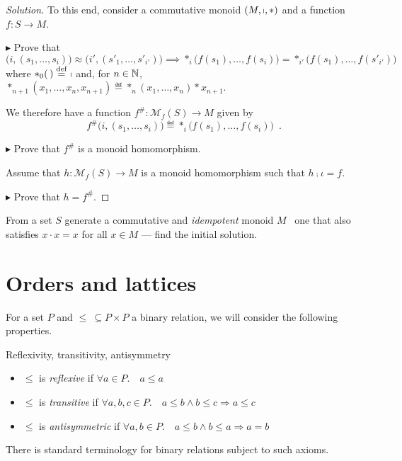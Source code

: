 \begin{proof}[Solution]
To this end, consider a commutative monoid $(M,\shortmid,\ast)$ and a function
$f:S\to M$.

$\blacktriangleright$ Prove that
\[
  \big(i,(s_1,\ldots,s_i)\big)
  \approx
  \big(i',(s'_1,\ldots,s'_{i'})\big)
  \implies
  \ast_i\big(f(s_1),\ldots,f(s_i)\big)
  =
  \ast_{i'}\big(f(s_1),\ldots,f(s'_{i'})\big)
\]
where $\ast_0(\,) \stackrel{\text{def}}{=}\ \shortmid$ and, for $n\in\mathbb{N}$,
$\ast_{n+1}(x_1,\ldots,x_n,x_{n+1})\eqdef \ast_n(x_1,\ldots,x_n)\ast x_{n+1}$.

We therefore have a function $f^\#: \mathcal M_f(S)\to M$ given by
\[
  f^\#\big(i,(s_1,\ldots,s_i)\big) 
  \eqdef
  \ast_i\big( f(s_1),\ldots,f(s_i)\big)
  \enspace.
\]

$\blacktriangleright$ Prove that $f^\#$ is a monoid homomorphism.

Assume that $h:\mathcal M_f(S)\to M$ is a monoid homomorphism such that
$h\comp\iota=f$.

$\blacktriangleright$ Prove that $h=f^\#$.
\end{proof}

\begin{exercise}
From a set $S$ generate a commutative and \textit{idempotent} monoid $M$ \ie~one
that also satisfies $x \cdot x = x$ for all $x \in M$ --- find the initial
solution.
\end{exercise}

\section{Orders and lattices}

For a set $P$ and $\leq\ \subseteq P \times P$ a binary relation, we will
consider the following properties.

\begin{definition}
Reflexivity, transitivity, antisymmetry
\begin{itemize}[noitemsep,topsep=0pt]
    \item $\leq$ is \textit{reflexive} if $\forall a \in P.\quad a \leq a$
    \item $\leq$ is \textit{transitive} if
      $\forall a,b,c \in P. \quad a \leq b \wedge b \leq c \Rightarrow a \leq c$
    \item $\leq$ is \textit{antisymmetric} if $\forall a,b \in P. \quad
      a \leq b \wedge b \leq a \Rightarrow a = b$
\end{itemize}
\end{definition}

There is standard terminology for binary relations subject to such axioms.

